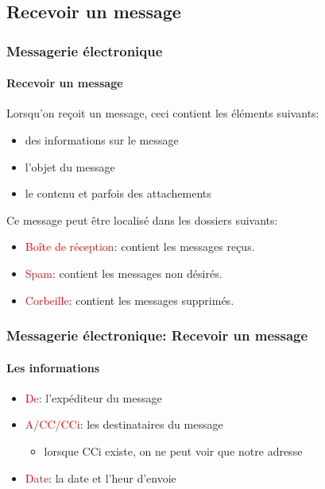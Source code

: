 \documentclass{beamer}
\begin{document}
%
%


\subsection{Recevoir un message}

\begin{frame}
\frametitle{Messagerie électronique}
\framesubtitle{Recevoir un message}

Lorsqu'on reçoit un message, ceci contient les éléments suivants: 
\begin{itemize}
	\item des informations sur le message
	\item l'objet du message
	\item le contenu et parfois des attachements
\end{itemize}

Ce message peut être localisé dans les dossiers suivants:
\begin{itemize}
	\item \textcolor{red}{Boîte de réception}: contient les messages reçus.
	\item \textcolor{red}{Spam}: contient les messages non désirés.
	\item \textcolor{red}{Corbeille}: contient les messages supprimés.
\end{itemize}

\end{frame}

\begin{frame}
\frametitle{Messagerie électronique: Recevoir un message}
\framesubtitle{Les informations}

\begin{itemize}
	\item \textcolor{red}{De}: l'expéditeur du message
	
	\item \textcolor{red}{A/CC/CCi}: les destinataires du message 
	\begin{itemize}
		\item lorsque CCi existe, on ne peut voir que notre adresse 
	\end{itemize}
	
	\item \textcolor{red}{Date}: la date et l'heur d'envoie  
	
\end{itemize}


\end{frame}
\end{document}
